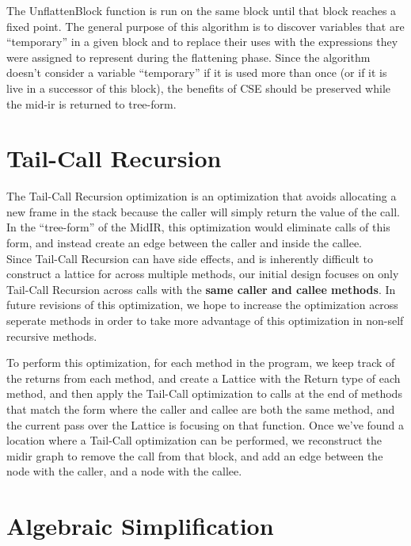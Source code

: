 \documentclass[11pt]{article}
\begin{document}
\noindent The UnflattenBlock function is run on the same block until that block
reaches a fixed point. The general purpose of this algorithm is to
discover variables that are ``temporary'' in a given block and to replace
their uses with the expressions they were assigned to represent during
the flattening phase. Since the algorithm doesn't consider a variable
``temporary'' if it is used more than once (or if it is live in a
successor of this block), the benefits of CSE should be preserved
while the mid-ir is returned to tree-form. 

\section {Tail-Call Recursion}
\label{sec:tailcall}

The Tail-Call Recursion optimization is an optimization that avoids
allocating a new frame in the stack because the caller will simply
return the value of the call. In the ``tree-form'' of the MidIR, this
optimization would eliminate calls of this form, and instead create an
edge between the caller and inside the callee.\\

Since Tail-Call Recursion can have side effects, and is inherently
difficult to construct a lattice for across multiple methods, our
initial design focuses on only Tail-Call Recursion across calls with
the \textbf{same caller and callee methods}. In future revisions of
this optimization, we hope to increase the optimization across
seperate methods in order to take more advantage of this optimization
in non-self recursive methods.

To perform this optimization, for each method in the program, we keep
track of the returns from each method, and create a Lattice with the
Return type of each method, and then apply the Tail-Call optimization
to calls at the end of methods that match the form where the caller
and callee are both the same method, and the current pass over the
Lattice is focusing on that function. Once we've found a location
where a Tail-Call optimization can be performed, we reconstruct the
midir graph to remove the call from that block, and add an edge
between the node with the caller, and a node with the callee.


\section {Algebraic Simplification}
\label{sec:algebra}
\end{document}
